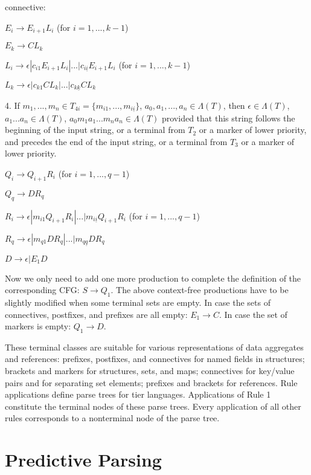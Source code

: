 \documentclass{llncs}
\begin{document}
connective:

\noindent
$E_i \rightarrow E_{i+1} L_i$ (for $i = 1,...,k-1$)

\noindent
$E_k \rightarrow C L_k$

\noindent
$L_i \rightarrow \epsilon | c_{i1} E_{i+1} L_i | ... | c_{i \underline i} E_{i+1} L_i$ (for $i = 1,...,k-1$)

\noindent
$L_k \rightarrow \epsilon | c_{k1} C L_k | ... | c_{k \underline k} C L_k$ 

4. If $m_1,...,m_n \in T_{4i} = \{ m_{i1},...,m_{i \underline i} \}$, $a_0,a_1,...,a_n \in \Lambda(T)$, then $\epsilon \in \Lambda(T)$, $a_1 ... a_n \in \Lambda(T)$, $a_0 m_1 a_1 ... m_n a_n \in \Lambda(T)$ provided that this string follows the beginning of the input string, or a terminal from $T_2$ or a marker of lower priority, and precedes the end of the input string, or a terminal from $T_3$ or a marker of lower priority.

\noindent
$Q_i \rightarrow Q_{i+1} R_i$ (for $i = 1,...,q-1$)

\noindent
$Q_q \rightarrow D R_q$

\noindent
$R_i \rightarrow \epsilon | m_{i1} Q_{i+1} R_i | ... | m_{i \underline i} Q_{i+1} R_i$ (for $i = 1,...,q-1$)

\noindent
$R_q \rightarrow \epsilon | m_{q1} D R_q | ... | m_{q \underline q} D R_q$

\noindent
$D \rightarrow \epsilon | E_1 D$

Now we only need to add one more production to complete the definition of the corresponding CFG: 
$S \rightarrow Q_1$.
The above context-free productions have to be slightly modified when some terminal sets are empty. In case the sets of connectives, postfixes, and prefixes are all empty:
$E_1 \rightarrow C$.
In case the set of markers is empty:
$Q_1 \rightarrow D$.

These terminal classes  are suitable for various representations of data aggregates and references: prefixes, postfixes, and connectives for named fields in structures; brackets and markers for structures, sets, and maps; connectives for key/value pairs and for separating set elements; prefixes and brackets for references. Rule applications define parse trees for tier languages. Applications of Rule 1 constitute the terminal nodes of these parse trees. Every application of all other rules corresponds to a nonterminal node of the parse tree.


\section{Predictive Parsing}
\end{document}
